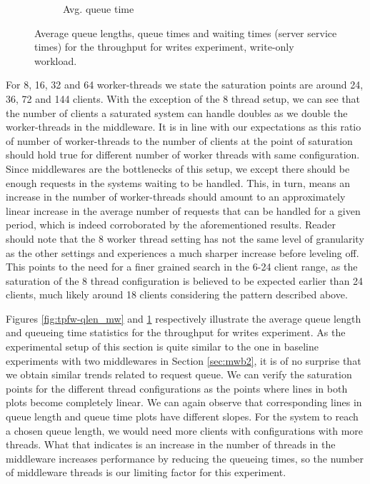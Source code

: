\documentclass[11pt,a4paper]{article}
\begin{document}
\begin{figure}[h]
\begin{subfigure}{.5\textwidth}
  \caption{Avg. queue time}
  \label{fig:tpfw-qtime_mw}
\end{subfigure}
\caption{Average queue lengths, queue times and waiting times (server service times) for the throughput for writes experiment, write-only workload.}
\label{fig:tpfw_stats_mw}
\end{figure}
\par For 8, 16, 32 and 64 worker-threads we state the saturation points are around 24, 36, 72 and 144 clients. With the exception of the 8 thread setup, we can see that the number of clients a saturated system can handle doubles as we double the worker-threads in the middleware. It is in line with our expectations as this ratio of number of worker-threads to the number of clients at the point of saturation should hold true for different number of worker threads with same configuration. Since middlewares are the bottlenecks of this setup, we except there should be enough requests in the systems waiting to be handled. This, in turn, means an increase in the number of worker-threads should amount to an approximately linear increase in the average number of requests that can be handled for a given period, which is indeed corroborated by the aforementioned results. Reader should note that the 8 worker thread setting has not the same level of granularity as the other settings and experiences a much sharper increase before leveling off. This points to the need for a finer grained search in the 6-24 client range, as the saturation of the 8 thread configuration is believed to be expected earlier than 24 clients, much likely around 18 clients considering the pattern described above.
\par Figures \ref{fig:tpfw-qlen_mw} and \ref{fig:tpfw-qtime_mw} respectively illustrate the average queue length and queueing time statistics for the throughput for writes experiment. As the experimental setup of this section is quite similar to the one in baseline experiments with two middlewares in Section \ref{sec:mwb2}, it is of no surprise that we obtain similar trends related to request queue. We can verify the saturation points for the different thread configurations as the points where lines in both plots become completely linear. We can again observe that corresponding lines in queue length and queue time plots have different slopes. For the system to reach a chosen queue length, we would need more clients with configurations with more threads. What that indicates is an increase in the number of threads in the middleware increases performance by reducing the queueing times, so the number of middleware threads is our limiting factor for this experiment.
\end{document}
